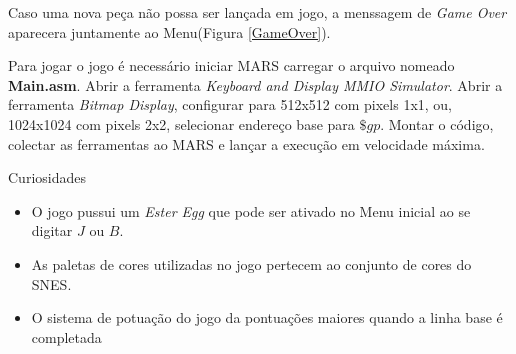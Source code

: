 \documentclass{article}
\begin{document}
Caso uma nova peça não possa ser lançada em jogo, a menssagem de \textit{Game Over} aparecera juntamente ao Menu(Figura \ref{GameOver}).

Para jogar o jogo é necessário iniciar MARS carregar o arquivo nomeado \textbf{Main.asm}. Abrir a ferramenta \textit{Keyboard and Display MMIO Simulator}. Abrir a ferramenta \textit{Bitmap Display}, configurar para 512x512 com pixels 1x1, ou, 1024x1024 com pixels 2x2, selecionar endereço base para $\$gp$. Montar o código, colectar as ferramentas ao MARS e lançar a execução em velocidade máxima.

Curiosidades
\begin{itemize}
  \item O jogo pussui um \textit{Ester Egg} que pode ser ativado no Menu inicial ao se digitar $J$ ou $B$.
  \item As paletas de cores utilizadas no jogo pertecem ao conjunto de cores do SNES.
  \item O sistema de potuação do jogo da pontuações maiores quando a linha base é completada
\end{itemize}
\end{document}
